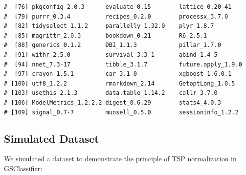 \documentclass[
  12pt,
]{book}
\begin{document}
\begin{verbatim}
#  [76] pkgconfig_2.0.3      evaluate_0.15        lattice_0.20-41     
#  [79] purrr_0.3.4          recipes_0.2.0        processx_3.7.0      
#  [82] tidyselect_1.1.2     parallelly_1.32.0    plyr_1.8.7          
#  [85] magrittr_2.0.3       bookdown_0.21        R6_2.5.1            
#  [88] generics_0.1.2       DBI_1.1.3            pillar_1.7.0        
#  [91] withr_2.5.0          survival_3.3-1       abind_1.4-5         
#  [94] nnet_7.3-17          tibble_3.1.7         future.apply_1.9.0  
#  [97] crayon_1.5.1         car_3.1-0            xgboost_1.6.0.1     
# [100] utf8_1.2.2           rmarkdown_2.14       GetoptLong_1.0.5    
# [103] usethis_2.1.3        data.table_1.14.2    callr_3.7.0         
# [106] ModelMetrics_1.2.2.2 digest_0.6.29        stats4_4.0.3        
# [109] signal_0.7-7         munsell_0.5.0        sessioninfo_1.2.2
\end{verbatim}

\hypertarget{simulated-dataset}{%
\subsection{Simulated Dataset}\label{simulated-dataset}}

We simulated a dataset to demonstrate the principle of TSP normalization in GSClassifier:
\end{document}
